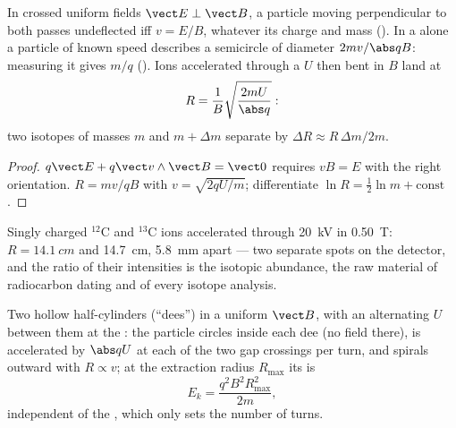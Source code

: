 \begin{proposition}\label{prop:b1:charged-particles:spectrometer}
In crossed uniform fields $\vect E \perp \vect B$, a particle moving
perpendicular to both passes undeflected iff $v = E/B$, whatever its
charge and mass (\emph{}). In a  alone a
particle of known speed describes a semicircle of diameter $2mv/\abs qB$:
measuring it gives $m/q$ (\emph{}). Ions accelerated
through a  $U$ then bent in $B$ land at
\[
R = \frac{1}{B}\sqrt{\frac{2mU}{\abs q}} :
\]
two isotopes of masses $m$ and $m + \Delta m$ separate by $\Delta R \approx
R\,\Delta m/2m$.
\end{proposition}

\begin{proof}
$q\vect E + q\vect v\wedge\vect B = \vect 0$ requires $vB = E$ with the right
orientation. $R = mv/qB$ with $v = \sqrt{2qU/m}$; differentiate
$\ln R = \tfrac12\ln m + \text{const}$.
\end{proof}

\begin{example}\label{ex:b1:charged-particles:isotopes}
Singly charged $^{12}$C and $^{13}$C ions accelerated through \qty{20}{kV}
in \qty{0.50}{T}: $R = \qty{14.1}{cm}$ and \qty{14.7}{cm}, \qty{5.8}{mm}
apart --- two separate spots on the detector, and the ratio of their
intensities is the isotopic abundance, the raw material of radiocarbon
dating and of every isotope analysis.
\end{example}

\begin{proposition}[Cyclotron]\label{prop:b1:charged-particles:cyclotron}
Two hollow half-cylinders (``dees'') in a uniform $\vect B$, with an
alternating  $U$ between them at the : the
particle circles inside each dee (no field there), is accelerated by
$\abs qU$ at each of the two gap crossings per turn, and spirals outward
with $R \propto v$; at the extraction radius $R_{\max}$ its  is
\[
E_k = \frac{q^2B^2R_{\max}^2}{2m},
\]
independent of the , which only sets the number of turns.
\end{proposition}

